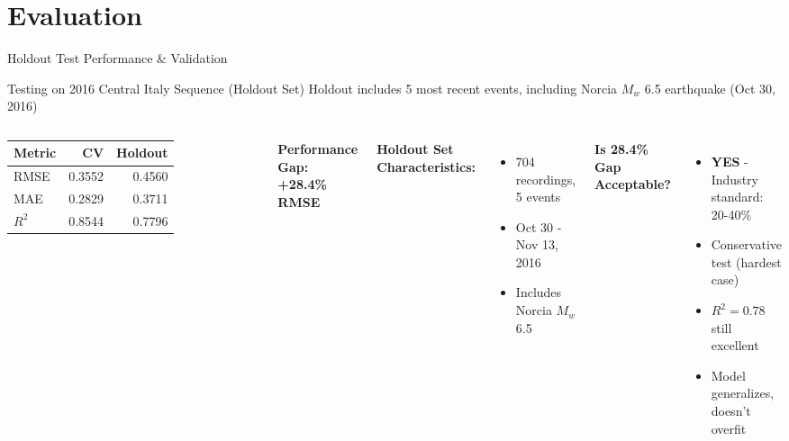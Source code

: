 \documentclass[aspectratio=169,11pt]{beamer}
\begin{document}
\section{Evaluation}

\begin{frame}{Holdout Test Performance \& Validation}
\begin{alertblock}{Testing on 2016 Central Italy Sequence (Holdout Set)}
Holdout includes 5 most recent events, including Norcia $M_w$ 6.5 earthquake (Oct 30, 2016)
\end{alertblock}

\vspace{0.2cm}
\begin{columns}[T]
\begin{table}
\centering
\small
\begin{tabular}{@{}lrr@{}}
\toprule
\textbf{Metric} & \textbf{CV} & \textbf{Holdout} \\
\midrule
RMSE & 0.3552 & 0.4560 \\
MAE & 0.2829 & 0.3711 \\
$R^2$ & 0.8544 & 0.7796 \\
\bottomrule
\end{tabular}
\end{table}

\vspace{0.1cm}
\textbf{Performance Gap: +28.4\% RMSE}

\vspace{0.2cm}
\textbf{Holdout Set Characteristics:}
\begin{itemize}
    \item 704 recordings, 5 events
    \item Oct 30 - Nov 13, 2016
    \item Includes Norcia $M_w$ 6.5
\end{itemize}

\textbf{Is 28.4\% Gap Acceptable?}
\begin{itemize}
    \item \textcolor{successgreen}{\textbf{YES}} - Industry standard: 20-40\%
    \item Conservative test (hardest case)
    \item $R^2 = 0.78$ still excellent
    \item Model generalizes, doesn't overfit
\end{itemize}


\end{columns}
\end{frame}
\end{document}
